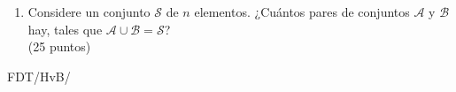 \documentclass[spanish, fleqn]{article}
\begin{document}
\begin{enumerate}
    Describa paso a paso cómo resuelve las siguientes:
    \begin{enumerate}
    \item
      ¿En cuántas de las permutaciones de \(n\)~números
      aparece el~\(1\) antes que el~\(2\)?
    \item
      ¿En cuántas de las permutaciones de \(n\)~números
      no aparecen contiguos \(1\) y \(2\)?
    \end{enumerate}
    \hspace*{\fill}(10 puntos)
  \item
    Considere un conjunto \(\mathcal{S}\) de \(n\) elementos.
    ¿Cuántos pares de conjuntos \(\mathcal{A}\) y \(\mathcal{B}\)
    hay,
    tales que \(\mathcal{A} \cup \mathcal{B} = \mathcal{S}\)?
    \\ \hspace*{\fill}(25 puntos)
  \end{enumerate}


  \vfill\hfill FDT/HvB/\LaTeXe
\end{document}
